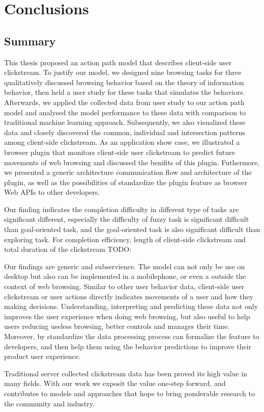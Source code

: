 \section{Conclusions}
\label{ch:final}

\subsection{Summary}


This thesis proposed an action path model that describes client-side user clickstream.
To justify our model, we designed nine browsing tasks for three qualitatively
discussed browsing behavior based on the theory of information behavior, then 
held a user study for these tasks that simulates the behaviors. 
Afterwards, we applied the collected data from user study to our action path model and
analysed the model performance to these data with comparison to traditional machine 
learning approach.
Subsequently, we also visualized these data and closely discovered the common, 
individual and intersection patterns among client-side clickstream.
As an application show case, we illustrated a browser plugin that monitors client-side 
user clickstream to predict future movements of web browsing and discussed the benifits of this plugin.
Futhermore, we presented a generic architecture communication flow and architecture of the plugin, 
as well as the possibilities of standardize the plugin feature as browser Web APIs to other developers.


Our finding indicates the completion difficulty in different type of tasks are significant different,
especially the difficulty of fuzzy task is significant difficult than goal-oriented task,
and the goal-oriented task is also significant difficult than exploring task.
For completion efficiency, length of client-side clickstream and total duration of the clickstream
TODO:

Our findings are generic and subservience. The model can not only be use on desktop but
also can be implemented in a mobilephone, or even a outside the context of web browsing. 
Similar to other user behavior data, client-side user clickstream or user actions 
directly indicates movements of a user and how they making decisions. Understanding, 
interpreting and predicting these data not only improves the user experience when doing
web browsing, but also useful to help users reducing useless browsing, better controls 
and manages their time. Moreover, by standardize the data processing process can formalize
the feature to developers, and then help them using the behavior predictions to
improve their product user experience.

Traditional server collected clickstream data has been proved its high value in many 
fields. With our work we exposit the value one-step forward, and contributes to models 
and approaches that hope to bring ponderable research to the community and industry.


\cleardoublepage